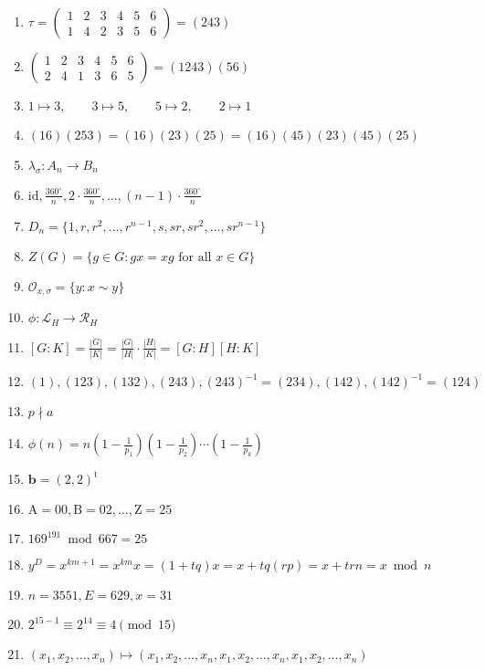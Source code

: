 \documentclass[oneside,10pt,]{article}
\newcommand{\identity}{\mathrm{id}}
\newcommand{\notdivide}{\nmid}
\newcommand{\transpose}{\text{t}}
\begin{document}
\begin{enumerate}
\item{}\(\tau = \begin{pmatrix} 1 & 2 & 3 & 4 & 5 & 6 \\ 1 & 4 & 2 & 3 & 5 & 6 \end{pmatrix} = (2 4 3)\)%
\item{}\(\begin{pmatrix} 1 & 2 & 3 & 4 & 5 & 6 \\ 2 & 4 & 1 & 3 & 6 & 5 \end{pmatrix} = (1 2 4 3)(5 6)\)%
\item{}\(1 \mapsto 3, \qquad 3 \mapsto 5, \qquad 5 \mapsto 2, \qquad 2 \mapsto 1\)%
\item{}\(( 1 6 ) (2 5 3) = (1 6 )( 2 3 )( 2 5 ) = (1 6 )( 4 5 )(2 3 )( 4 5 )(2 5 )\)%
\item{}\(\lambda_{\sigma} : A_n \rightarrow B_n\)%
\item{}\(\identity, \frac{360^{\circ} }{n}, 2 \cdot \frac{360^{\circ} }{n}, \ldots, (n-1) \cdot \frac{360^{\circ} }{n}\)%
\item{}\(D_n = \{1, r, r^2, \ldots, r^{n-1}, s, sr, sr^2, \ldots, sr^{n-1}\}\)%
\item{}\(Z(G) = \{ g \in G : gx = xg \text{ for all } x \in G \}\)%
\item{}\({\mathcal O}_{x, \sigma} = \{ y : x \sim y \}\)%
\item{}\(\phi : {\mathcal L}_H \rightarrow {\mathcal R}_H\)%
\item{}\([G:K] = \frac{|G|}{|K|} = \frac{|G|}{|H|} \cdot \frac{|H|}{|K|} = [G:H][H:K]\)%
\item{}\((1), (123), (132), (243), (243)^{-1} = (234), (142), (142)^{-1} = (124)\)%
\item{}\(p \notdivide a\)%
\item{}\(\phi(n) = n \left( 1 - \frac{1}{p_1} \right) \left( 1 - \frac{1}{p_2} \right)\cdots \left( 1 - \frac{1}{p_k} \right)\)%
\item{}\({\mathbf b} = ( 2, 2)^\transpose\)%
\item{}\(\text{A} = 00, \text{B} = 02, \ldots, \text{Z}= 25\)%
\item{}\(169^{191} \bmod 667 = 25\)%
\item{}\(y^D = x^{km + 1} = x^{km} x = (1 + tq) x = x + tq(rp) = x + trn = x \bmod n\)%
\item{}\(n = 3551, E = 629, x = 31\)%
\item{}\(2^{15-1} \equiv 2^{14} \equiv 4 \pmod{15}\)%
\item{}\((x_{1}, x_{2}, \ldots, x_{n}) \mapsto (x_{1}, x_{2}, \ldots, x_{n}, x_{1}, x_{2}, \ldots, x_{n}, x_{1}, x_{2}, \ldots, x_{n})\)%

\end{enumerate}
\end{document}
